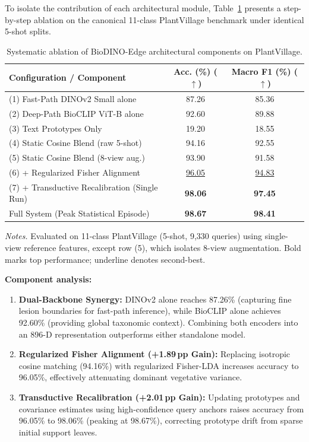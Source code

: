 \documentclass[preprint,12pt]{elsarticle}
\begin{document}
To isolate the contribution of each architectural module, Table~\ref{tab:ablation} presents a step-by-step ablation on the canonical 11-class PlantVillage benchmark under identical 5-shot splits.

\begin{table}[htbp]
\caption{Systematic ablation of BioDINO-Edge architectural components on PlantVillage.}
\label{tab:ablation}
\centering

\footnotesize
\setlength{\tabcolsep}{3pt}
\begin{tabular*}{\columnwidth}{@{\extracolsep{\fill}}lcc}
\toprule
\textbf{Configuration / Component} & \textbf{Acc. (\%) ($\uparrow$)} & \textbf{Macro F1 (\%) ($\uparrow$)} \\
\midrule
(1) Fast-Path DINOv2 Small alone & 87.26 & 85.36 \\
(2) Deep-Path BioCLIP ViT-B alone & 92.60 & 89.88 \\
(3) Text Prototypes Only & 19.20 & 18.55 \\
(4) Static Cosine Blend (raw 5-shot) & 94.16 & 92.55 \\
(5) Static Cosine Blend (8-view aug.) & 93.90 & 91.58 \\
(6) + Regularized Fisher Alignment & \underline{96.05} & \underline{94.83} \\
(7) + Transductive Recalibration (Single Run) & \textbf{98.06} & \textbf{97.45} \\
\midrule
Full System (Peak Statistical Episode) & \textbf{98.67} & \textbf{98.41} \\
\bottomrule
\end{tabular*}

\vspace{3pt}
\begin{minipage}{\columnwidth}
\footnotesize
\textit{Notes.} Evaluated on 11-class PlantVillage (5-shot, 9,330 queries) using single-view reference features, except row (5), which isolates 8-view augmentation. Bold marks top performance; underline denotes second-best.
\end{minipage}
\end{table}

\textbf{Component analysis:}
\begin{enumerate}
    \item \textbf{Dual-Backbone Synergy:} DINOv2 alone reaches 87.26\% (capturing fine lesion boundaries for fast-path inference), while BioCLIP alone achieves 92.60\% (providing global taxonomic context). Combining both encoders into an 896-D representation outperforms either standalone model.
    \item \textbf{Regularized Fisher Alignment (+1.89\,pp Gain):} Replacing isotropic cosine matching (94.16\%) with regularized Fisher-LDA increases accuracy to 96.05\%, effectively attenuating dominant vegetative variance.
    \item \textbf{Transductive Recalibration (+2.01\,pp Gain):} Updating prototypes and covariance estimates using high-confidence query anchors raises accuracy from 96.05\% to 98.06\% (peaking at 98.67\%), correcting prototype drift from sparse initial support leaves.
\end{enumerate}
\end{document}
